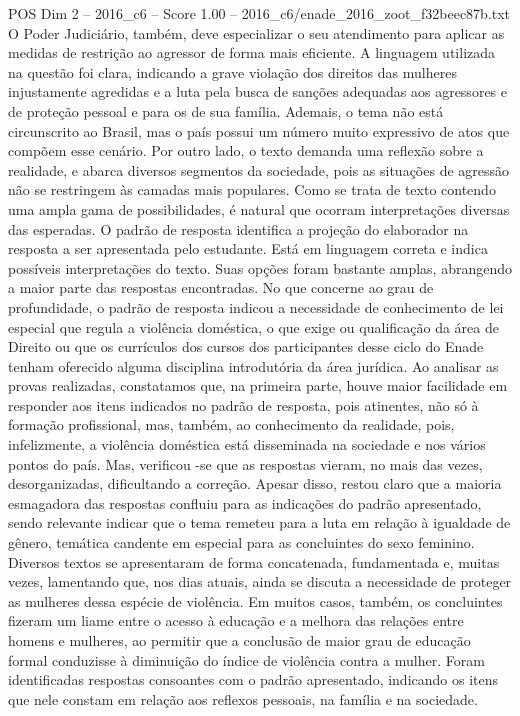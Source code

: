 \begin{textsample}{POS Dim 2 – 2016\_c6 – Score 1.00 – 2016\_c6/enade\_2016\_zoot\_f32beec87b.txt}
O Poder Judiciário, também, deve especializar o seu atendimento para aplicar as medidas de restrição ao agressor de forma mais eficiente.
A linguagem utilizada na questão foi clara, indicando a grave violação dos direitos das mulheres injustamente agredidas e a luta pela busca de sanções adequadas aos agressores e de proteção pessoal e para os de sua família.
Ademais, o tema não está circunscrito ao Brasil, mas o país possui um número muito expressivo de atos que compõem esse cenário.
Por outro lado, o texto demanda uma reflexão sobre a realidade, e abarca diversos segmentos da sociedade, pois as situações de agressão não se restringem às camadas mais populares.
Como se trata de texto contendo uma ampla gama de possibilidades, é natural que ocorram interpretações diversas das esperadas.
O padrão de resposta identifica a projeção do elaborador na resposta a ser apresentada pelo estudante.
Está em linguagem correta e indica possíveis interpretações do texto.
Suas opções foram bastante amplas, abrangendo a maior parte das respostas encontradas.
No que concerne ao grau de profundidade, o padrão de resposta indicou a necessidade de conhecimento de lei especial que regula a violência doméstica, o que exige ou qualificação da área de Direito ou que os currículos dos cursos dos participantes desse ciclo do Enade tenham oferecido alguma disciplina introdutória da área jurídica.
Ao analisar as provas realizadas, constatamos que, na primeira parte, houve maior facilidade em responder aos itens indicados no padrão de resposta, pois atinentes, não só à formação profissional, mas, também, ao conhecimento da realidade, pois, infelizmente, a violência doméstica está disseminada na sociedade e nos vários pontos do país.
Mas, verificou -se que as respostas vieram, no mais das vezes, desorganizadas, dificultando a correção.
Apesar disso, restou claro que a maioria esmagadora das respostas confluiu para as indicações do padrão apresentado, sendo relevante indicar que o tema remeteu para a luta em relação à igualdade de gênero, temática candente em especial para as concluintes do sexo feminino.
Diversos textos se apresentaram de forma concatenada, fundamentada e, muitas vezes, lamentando que, nos dias atuais, ainda se discuta a necessidade de proteger as mulheres dessa espécie de violência.
Em muitos casos, também, os concluintes fizeram um liame entre o acesso à educação e a melhora das relações entre homens e mulheres, ao permitir que a conclusão de maior grau de educação formal conduzisse à diminuição do índice de violência contra a mulher.
Foram identificadas respostas consoantes com o padrão apresentado, indicando os itens que nele constam em relação aos reflexos pessoais, na família e na sociedade.

\end{textsample}
